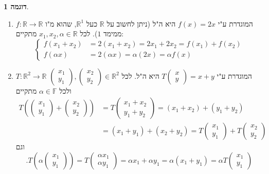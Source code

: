 \documentclass[12pt]{report}
\theoremstyle{plain}
\theoremstyle{definition}
\newtheorem{example}{דוגמה}[chapter]
\newcommand{\R}{\mathbb{R}}
\newcommand{\F}{\mathbb{F}}
\newcommand{\0}{\mathbf{0}}
\begin{document}
\begin{example}\
\begin{enumerate}[label=\alph*.]
\item 
$f:\R\to\R$
המוגדרת ע"י
$f(x)=2x$
היא ה"ל
(ניתן לחשוב על
$\R$
כעל
$\R^1$,
שהוא מ"ו ממימד 
$1$).
לכל
$x_1,x_2,\alpha\in\R$
מתקיים:
$$
\left\{
\begin{aligned}
f(x_1+x_2)&=2(x_1+x_2)=2x_1+2x_2=f(x_1)+f(x_2) \\
f(\alpha x)&=2(\alpha x)=\alpha(2x)=\alpha f(x)
\end{aligned}
\right.
$$


\item
$T:\R^2\to\R$
המוגדרת ע"י
$T\begin{pmatrix}x \\y\end{pmatrix}=x+y$
היא ה"ל. לכל 
$\begin{pmatrix}x_1 \\y_1\end{pmatrix},\begin{pmatrix}x_2 \\y_2\end{pmatrix}\in\R^2$
ולכל 
$\alpha\in\F$
מתקיים
$$
\begin{aligned}
T\left(\begin{pmatrix}x_1 \\y_1\end{pmatrix}+\begin{pmatrix}x_2 \\y_2\end{pmatrix}\right)&=T\begin{pmatrix}x_1+x_2 \\y_1+y_2\end{pmatrix}=(x_1+x_2)+(y_1+y_2)\\
&=(x_1+y_1)+(x_2+y_2)=T\begin{pmatrix}x_1 \\y_1\end{pmatrix}+T\begin{pmatrix}x_2 \\y_2\end{pmatrix}
\end{aligned}
$$
וגם
$$
.T\left(\alpha\begin{pmatrix}x_1 \\y_1\end{pmatrix}\right)=T\begin{pmatrix}\alpha x_1 \\\alpha y_1\end{pmatrix}=\alpha x_1+\alpha y_1=\alpha(x_1+y_1)=\alpha T\begin{pmatrix}x_1 \\y_1\end{pmatrix}
$$



\end{enumerate}
\end{example}
\end{document}
